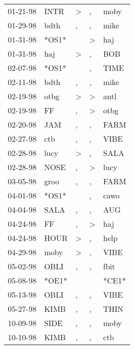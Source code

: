 \begin{supertabular}{lllll}
 01-21-98 &   INTR &     \textgreater &                , &   moby \\
 01-29-98 &   bdth &                , &                , &   mike \\
 01-31-98 &  *OS1* &                  &     \textgreater &    haj \\
 01-31-98 &    haj &     \textgreater &                , &    BOB \\
 02-07-98 &  *OS1* &                  &                , &   TIME \\
 02-11-98 &   bdth &                , &                , &   mike \\
 02-19-98 &   otbg &     \textgreater &     \textgreater &   antl \\
 02-19-98 &     FF &                , &     \textgreater &   otbg \\
 02-20-98 &    JAM &                , &                , &   FARM \\
 02-27-98 &    ctb &                , &                , &   VIBE \\
 02-28-98 &   lucy &     \textgreater &                , &   SALA \\
 02-28-98 &   NOSE &                , &     \textgreater &   lucy \\
 03-05-98 &   groo &                , &                , &   FARM \\
 04-01-98 &  *OS1* &                  &                , &   cawo \\
 04-04-98 &   SALA &                , &                , &    AUG \\
 04-24-98 &     FF &                , &     \textgreater &    haj \\
 04-24-98 &   HOUR &     \textgreater &                , &   help \\
 04-29-98 &   moby &     \textgreater &                , &   VIBE \\
 05-02-98 &   OBLI &                , &                , &   fbit \\
 05-08-98 &  *OE1* &                  &                  &  *CE1* \\
 05-13-98 &   OBLI &                , &                , &   VIBE \\
 05-27-98 &   KIMB &                , &                , &   THIN \\
 10-09-98 &   SIDE &                , &                , &   moby \\
 10-10-98 &   KIMB &                , &                , &    ctb \\

\end{supertabular}
